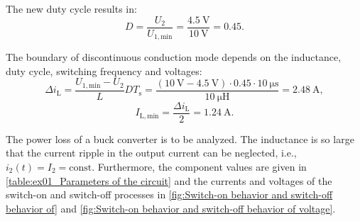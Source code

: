 \begin{solutionblock}
    The new duty cycle results in:
    \begin{equation}    
        D= \frac{U_\mathrm{2}}{U_{\mathrm{1,min}}} = \frac{\SI{4.5}{\volt}}{\SI{10}{\volt}} = 0.45.
    \end{equation}    
\end{solutionblock}

\begin{solutionblock}
    The boundary of discontinuous conduction mode depends on the inductance, duty cycle, switching frequency and voltages:
    \begin{equation}
        \Delta i_\mathrm{L} = \frac{U_{\mathrm{1,min}} - U_\mathrm{2}}{L} D T_\mathrm{s} = \frac{(\SI{10}{\volt} - \SI{4.5}{\volt}) \cdot 0.45 \cdot \SI{10}{\micro \second}}{\SI{10}{\micro \henry}} = \SI{2.48}{\ampere},
    \end{equation}
    \begin{equation}
        I_{\mathrm{L,min}} = \frac{\Delta i_\mathrm{L}}{2} = \SI{1.24}{\ampere}.
    \end{equation}
\end{solutionblock}







The power loss of a buck converter is to be analyzed. The inductance is so large
that the current ripple in the output current can be neglected, i.e., $ i_{\mathrm{2}}(t) = I_{\mathrm{2}} =\mathrm{const}$. Furthermore, the component values are given in \autoref{table:ex01_Parameters of the circuit} and the currents and voltages of the switch-on and switch-off processes in \autoref{fig:Switch-on behavior and switch-off behavior of} and \autoref{fig:Switch-on behavior and switch-off behavior of voltage}. 




